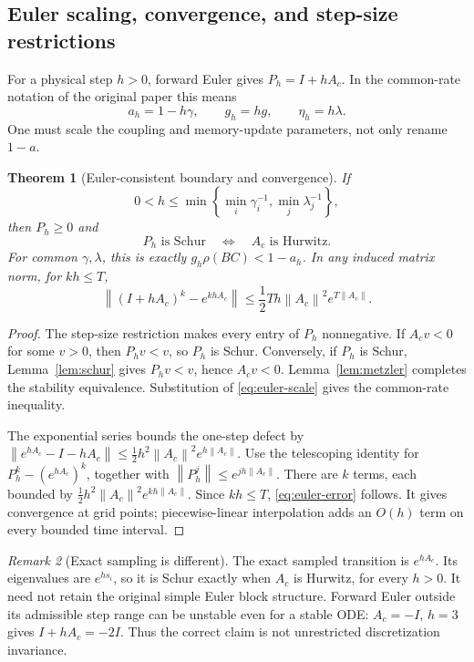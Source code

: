 \documentclass[11pt,a4paper]{article}
\newtheorem{theorem}{Theorem}[section]
\theoremstyle{definition}\newtheorem{definition}[theorem]{Definition}
\theoremstyle{remark}\newtheorem{remark}[theorem]{Remark}
\newcommand{\norm}[1]{\left\lVert#1\right\rVert}
\begin{document}
\subsection{Euler scaling, convergence, and step-size restrictions}
For a physical step $h>0$, forward Euler gives $P_h=I+hA_c$. In the common-rate notation of the original paper this means
\begin{equation}
 a_h=1-h\gamma,\qquad g_h=hg,\qquad \eta_h=h\lambda.
 \label{eq:euler-scale}
\end{equation}
One must scale the coupling and memory-update parameters, not only rename $1-a$.

\begin{theorem}[Euler-consistent boundary and convergence]\label{thm:euler}
If
\[
 0<h\le\min\!\left\{\min_i\gamma_i^{-1},\min_j\lambda_j^{-1}\right\},
\]
then $P_h\ge0$ and
\[
 P_h\text{ is Schur}\quad\Longleftrightarrow\quad A_c\text{ is Hurwitz}.
\]
For common $\gamma,\lambda$, this is exactly
$g_h\rho(BC)<1-a_h$. In any induced matrix norm, for $kh\le T$,
\begin{equation}
 \norm{(I+hA_c)^k-e^{khA_c}}
 \le \frac12 Th\norm{A_c}^2e^{T\norm{A_c}}.
 \label{eq:euler-error}
\end{equation}
\end{theorem}
\begin{proof}
The step-size restriction makes every entry of $P_h$ nonnegative. If $A_cv<0$ for some $v>0$, then $P_hv<v$, so $P_h$ is Schur. Conversely, if $P_h$ is Schur, Lemma~\ref{lem:schur} gives $P_hv<v$, hence $A_cv<0$. Lemma~\ref{lem:metzler} completes the stability equivalence. Substitution of \eqref{eq:euler-scale} gives the common-rate inequality.

The exponential series bounds the one-step defect by
$\norm{e^{hA_c}-I-hA_c}\le\tfrac12h^2\norm{A_c}^2e^{h\norm{A_c}}$.
Use the telescoping identity for $P_h^k-(e^{hA_c})^k$, together with
$\norm{P_h^j}\le e^{jh\norm{A_c}}$. There are $k$ terms, each bounded by
$\tfrac12h^2\norm{A_c}^2e^{kh\norm{A_c}}$. Since $kh\le T$, \eqref{eq:euler-error} follows. It gives convergence at grid points; piecewise-linear interpolation adds an $O(h)$ term on every bounded time interval.
\end{proof}

\begin{remark}[Exact sampling is different]
The exact sampled transition is $e^{hA_c}$. Its eigenvalues are $e^{h s_i}$, so it is Schur exactly when $A_c$ is Hurwitz, for every $h>0$. It need not retain the original simple Euler block structure. Forward Euler outside its admissible step range can be unstable even for a stable ODE: $A_c=-I$, $h=3$ gives $I+hA_c=-2I$. Thus the correct claim is not unrestricted discretization invariance.
\end{remark}
\end{document}
